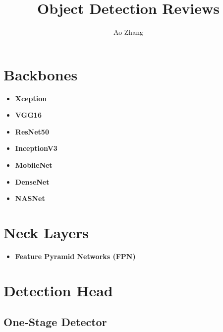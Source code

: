 \documentclass[a4paper]{article}
\title{Object Detection Reviews}
\author{Ao Zhang}
\begin{document}
\maketitle






\section{Backbones}

\begin{itemize}
	\item \textbf{Xception}
	\item \textbf{VGG16}
	\item \textbf{ResNet50}
	\item \textbf{InceptionV3}
	\item \textbf{MobileNet}
	\item \textbf{DenseNet}
	\item \textbf{NASNet}
\end{itemize}

\section{Neck Layers}

\begin{itemize}
	\item \textbf{Feature Pyramid Networks (FPN)}
\end{itemize}


\section{Detection Head}

\subsection{One-Stage Detector}
\end{document}
